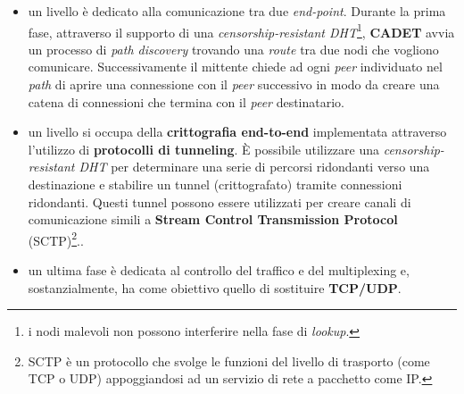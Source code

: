 \begin{itemize}
    \item un livello è dedicato alla comunicazione tra due \textit{end-point}. Durante la prima fase, attraverso il supporto di una \textit{censorship-resistant DHT}\footnote{i nodi malevoli non possono interferire nella fase di \textit{lookup}.}, \textbf{CADET} avvia un processo di \textit{path discovery} trovando una \textit{route} tra due nodi che vogliono comunicare. Successivamente il mittente chiede ad ogni \textit{peer} individuato nel \textit{path} di aprire una connessione con il \textit{peer} successivo in modo da creare una catena di connessioni che termina con il \textit{peer} destinatario.
    \item un livello si occupa della \textbf{crittografia end-to-end} implementata attraverso l'utilizzo di \textbf{protocolli di tunneling}.
    È possibile utilizzare una \textit{censorship-resistant DHT} per determinare una serie di percorsi ridondanti verso una destinazione e stabilire un tunnel (crittografato) tramite connessioni ridondanti.
    Questi tunnel possono essere utilizzati per creare canali di comunicazione simili a \textbf{Stream Control Transmission Protocol} (SCTP)\footnote{SCTP è un protocollo che svolge le funzioni del livello di trasporto (come TCP o UDP) appoggiandosi ad un servizio di rete a pacchetto come IP.}.\cite{tunnel}.
    \item un ultima fase è dedicata al controllo del traffico e del multiplexing e, sostanzialmente, ha come obiettivo quello di sostituire \textbf{TCP/UDP}.
    
    
    
    
\end{itemize}

